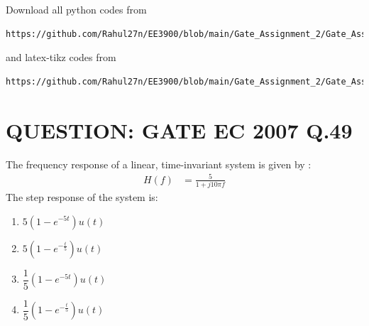 \documentclass[journal,12pt,twocolumn]{IEEEtran}
\begin{document}
\maketitle
\newpage
\bigskip
\renewcommand{\thefigure}{\theenumi}
\renewcommand{\thetable}{\theenumi}
Download all python codes from 
\begin{lstlisting}
https://github.com/Rahul27n/EE3900/blob/main/Gate_Assignment_2/Gate_Assignment_2.py
\end{lstlisting}
%
and latex-tikz codes from 
%
\begin{lstlisting}
https://github.com/Rahul27n/EE3900/blob/main/Gate_Assignment_2/Gate_Assignment_2.tex
\end{lstlisting}
\vspace{0.5cm}
\section{QUESTION: GATE EC 2007 Q.49}
The frequency response of a linear, time-invariant system is given by :
\begin{align}
H(f) &= \frac{5}{1 + j10\pi f} \nonumber
\end{align}
 The step response of the system is:
\begin{enumerate}[label=(\Alph*)]
\item $5(1-e^{-5t})u(t)$\\
\item $5(1-e^{-\frac{t}{5}})u(t)$\\
\item $\dfrac{1}{5}(1-e^{-5t})u(t)$\\ 
\item $\dfrac{1}{5}(1-e^{-\frac{t}{5}})u(t)$ 
\end{enumerate}
\end{document}
